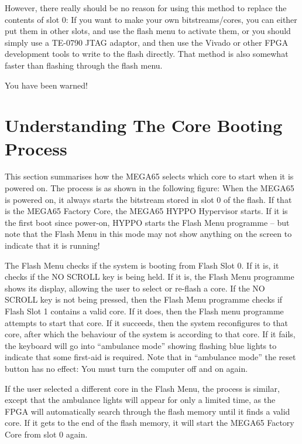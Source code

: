 However, there really should be no reason for using this method to replace the contents of slot 0:
If you want to make your own bitstreams/cores, you can either put them in other slots, and use the
flash menu to activate them, or you should simply use a TE-0790 JTAG adaptor, and then use
the Vivado or other FPGA development tools to write to the flash directly.  That method is also
somewhat faster than flashing through the flash menu.

You have been warned!

\section{Understanding The Core Booting Process}

This section summarises how the MEGA65 selects which core to start when it is powered on.
The process is as shown in the following figure: When the MEGA65 is
powered on, it always starts the bitstream stored in slot 0 of the
flash.  If that is the MEGA65 Factory Core, the MEGA65 HYPPO
Hypervisor starts.  If it is the first boot since power-on, HYPPO
starts the Flash Menu programme -- but note that the Flash Menu in
this mode may not show anything on the screen to indicate that it is
running!

The Flash Menu checks if the system is booting from Flash
Slot 0.  If it is, it checks if the NO SCROLL key is being held.  If
it is, the Flash Menu programme shows its display, allowing the user
to select or re-flash a core. If the NO SCROLL key is not being
pressed, then the Flash Menu programme checks if Flash Slot 1 contains a valid
core.  If it does, then the Flash menu programme attempts to start
that core.  If it succeeds, then the system reconfigures to that core,
after which the behaviour of the system is according to that core. If
it fails, the keyboard will go into ``ambulance mode'' showing flashing blue
lights to indicate that some first-aid is required.  Note that in ``ambulance
mode'' the reset button has no effect: You must turn the computer off
and on again.

If the user selected a different core in the Flash Menu, the process
is similar, except that the ambulance lights will appear for only a
limited time, as the FPGA will automatically search through the flash
memory until it finds a valid core. If it gets to the end of the flash
memory, it will start the MEGA65 Factory Core from slot 0 again.

